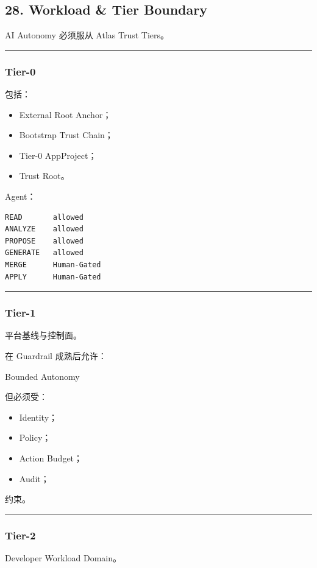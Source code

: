 \documentclass[11pt,a4paper]{article}
\begin{document}
\subsection{28. Workload \& Tier Boundary}
AI Autonomy 必须服从 Atlas Trust Tiers。

\vspace{0.5em}\hrule\vspace{0.5em}
\subsubsection{Tier-0}
包括：

\begin{itemize}
  \item External Root Anchor；
  \item Bootstrap Trust Chain；
  \item Tier-0 AppProject；
  \item Trust Root。
\end{itemize}
Agent：

\begin{lstlisting}[language=text]
READ       allowed
ANALYZE    allowed
PROPOSE    allowed
GENERATE   allowed
MERGE      Human-Gated
APPLY      Human-Gated
\end{lstlisting}
\vspace{0.5em}\hrule\vspace{0.5em}
\subsubsection{Tier-1}
平台基线与控制面。

在 Guardrail 成熟后允许：

\begin{gfmBlockquote}
Bounded Autonomy
\end{gfmBlockquote}
但必须受：

\begin{itemize}
  \item Identity；
  \item Policy；
  \item Action Budget；
  \item Audit；
\end{itemize}
约束。

\vspace{0.5em}\hrule\vspace{0.5em}
\subsubsection{Tier-2}
Developer Workload Domain。
\end{document}
